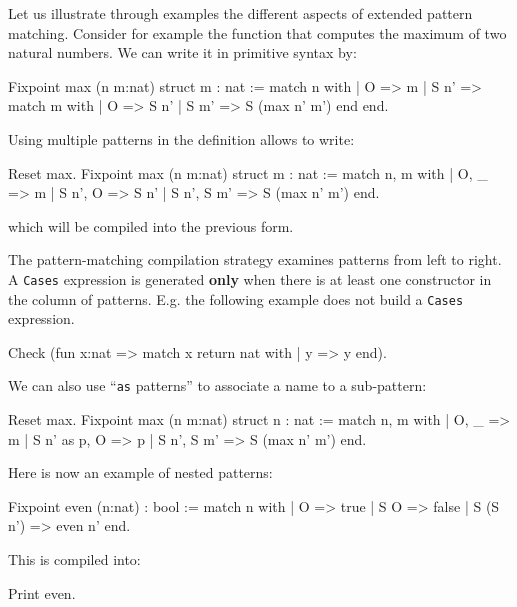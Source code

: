 Let us illustrate through examples the different aspects of extended
pattern matching. Consider for example the function that computes the
maximum of two natural numbers. We can write it in primitive syntax
by:

\begin{coq_example}
Fixpoint max (n m:nat) {struct m} : nat :=
  match n with
  | O => m
  | S n' => match m with
            | O => S n'
            | S m' => S (max n' m')
            end
  end.
\end{coq_example}

Using multiple patterns in the definition allows to write:

\begin{coq_example}
Reset max.
Fixpoint max (n m:nat) {struct m} : nat :=
  match n, m with
  | O, _ => m
  | S n', O => S n'
  | S n', S m' => S (max n' m')
  end.
\end{coq_example}

which will be compiled into the previous form.

The pattern-matching compilation strategy examines patterns from left
to right. A \texttt{Cases} expression is generated {\bf only} when
there is at least one constructor in the column of patterns. E.g. the
following example does not build a \texttt{Cases} expression.

\begin{coq_example}
Check (fun x:nat => match x return nat with
                    | y => y
                    end).
\end{coq_example}

We can also use ``\texttt{as} patterns'' to associate a name to a
sub-pattern:

\begin{coq_example}
Reset max.
Fixpoint max (n m:nat) {struct n} : nat :=
  match n, m with
  | O, _ => m
  | S n' as p, O => p
  | S n', S m' => S (max n' m')
  end.
\end{coq_example}

Here is now an example of nested patterns:

\begin{coq_example}
Fixpoint even (n:nat) : bool :=
  match n with
  | O => true
  | S O => false
  | S (S n') => even n'
  end.
\end{coq_example}

This is compiled into:

\begin{coq_example}
Print even.
\end{coq_example}

